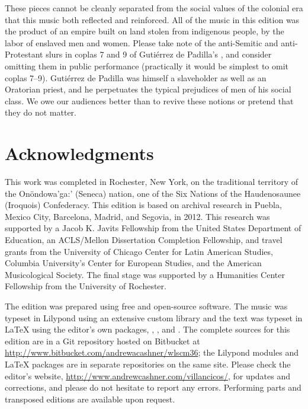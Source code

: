 These pieces cannot be cleanly separated from the social values of the colonial
era that this music both reflected and reinforced.
All of the music in this edition was the product of an empire built on land
stolen from indigenous people, by the labor of enslaved men and women.
Please take note of the anti-Semitic and anti-Protestant slurs in coplas 7 and
9 of Gutiérrez de Padilla's , and consider omitting them in
public performance (practically it would be simplest to omit coplas 7--9).%
    \Autocites
    [On Spanish anti-Semitism and representations of Jews, see][]
    {Martinez:GenealogicalFictions}
    {Nemiroff:ComediasJudaizantes}
Gutiérrez de Padilla was himself a slaveholder as well as an Oratorian priest,
and he perpetuates the typical prejudices of men of his social class.%
    \Autocite
    {Mauleon:PadillaCivil}
We owe our audiences better than to revive these notions or pretend that they
do not matter.%
    \Autocites
    {Baker:PerformancePostColonial}
    {Cashner:ImitatingAfricans}

\section{Acknowledgments}

This work was completed in Rochester, New York, on the traditional territory
of the Onöndowa'ga:' (Seneca) nation, one of the Six Nations of the
Haudenosaunee (Iroquois) Confederacy.
This edition is based on archival research in Puebla, Mexico City, Barcelona,
Madrid, and Segovia, in 2012.
This research was supported by a Jacob K. Javits Fellowship from the United
States Department of Education, an ACLS/Mellon Dissertation Completion
Fellowship, and travel grants from the University of Chicago Center for Latin
American Studies, Columbia University's Center for European Studies, and the
American Musicological Society.
The final stage was supported by a Humanities Center Fellowship from the
University of Rochester.

The edition was prepared using free and open-source software.
The music was typeset in Lilypond using an extensive custom library and the
text was typeset in \LaTeX{} using the editor's own packages,
, ,  and
.
The complete sources for this edition are in a Git repository hosted on
Bitbucket at \url{http://www.bitbucket.com/andrewacashner/wlscm36}; the
Lilypond modules and LaTeX packages are in separate repositories on the same
site.
Please check the editor's website,
\url{http://www.andrewcashner.com/villancicos/}, for updates and corrections,
and please do not hesitate to report any errors.
Performing parts and transposed editions are available upon request.

\endinput




